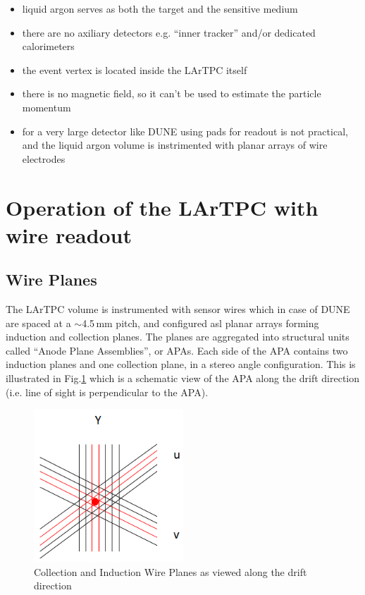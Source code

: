 \documentclass[a4paper]{jpconf}
\begin{document}
\begin{itemize}
\item liquid argon serves as both the target and the sensitive medium

\item there are no axiliary detectors e.g. ``inner tracker'' and/or dedicated calorimeters

\item the event vertex is  located inside the LArTPC itself

\item there is no magnetic field, so it can't be used to estimate the particle momentum

\item for a very large detector like DUNE using pads for readout is not practical, and the liquid argon volume is instrimented with planar arrays of wire
electrodes

\end{itemize}

\section{Operation of the LArTPC with wire readout}
\subsection{Wire Planes}
The LArTPC volume is instrumented with sensor wires which in case of DUNE are spaced at a $\sim$4.5\,mm pitch, and configured 
asl planar arrays forming induction and collection planes. The planes are aggregated into structural units called ``Anode Plane Assemblies'',
or APAs. Each side of the APA contains two induction planes and one collection plane, in a stereo angle configuration. This is illustrated in
Fig.\ref{fig:wireplanes1} which is a schematic view of the APA along the drift direction (i.e. line of sight is perpendicular to the APA).
\begin{figure}[h!]
	\centering
	\includegraphics[width=0.5\textwidth]{wireplanes1.png}
	\caption{Collection and Induction Wire Planes as viewed along the drift direction}
	\label{fig:wireplanes1}
\end{figure}
\end{document}
